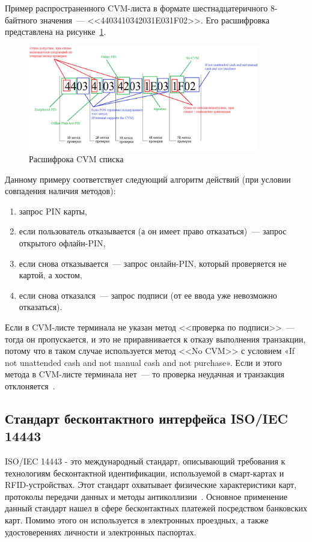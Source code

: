 Пример распространенного CVM-листа в формате шестнадцатеричного 8-байтного значения~--- <<4403410342031E031F02>>.
Его расшифровка представлена на рисунке~\ref{fig:cvm_check}.

\begin{figure}[H]
    \centering
    \includegraphics[width=0.9\textwidth]{images/research/cvm_check}
    \caption{\centering Расшифрока CVM списка}
    \label{fig:cvm_check}
\end{figure}

Данному примеру соответствует следующий алгоритм действий (при условии совпадения наличия методов):

\begin{enumerate}
    \item запрос PIN карты,
    \item если пользователь отказывается (а он имеет право отказаться)~--- запрос открытого офлайн-PIN,
    \item если снова отказывается~--- запрос онлайн-PIN, который проверяется не картой, а хостом,
    \item если снова отказался~--- запрос подписи (от ее ввода уже невозможно отказаться).
\end{enumerate}

Если в CVM-листе терминала не указан метод <<проверка по подписи>>~--- тогда он пропускается, и это не приравнивается к отказу выполнения транзакции, потому что в таком случае используется метод <<No CVM>> с условием «If not unattended cash and not manual cash and not purchase».
Если и этого метода в CVM-листе терминала нет~--– то проверка неудачная и транзакция отклоняется~\cite{habr_cvm}.


\subsection{Стандарт бесконтактного интерфейса ISO/IEC 14443}

ISO/IEC 14443 - это международный стандарт, описывающий требования к технологиям бесконтактной идентификации, используемой в смарт-картах и
RFID-устройствах. 
Этот стандарт охватывает физические характеристики карт, протоколы передачи данных и методы антиколлизии~\cite{iso_14443}.
Основное применение данный стандарт нашел в сфере бесконтактных платежей посредством банковских карт.
Помимо этого он используется в электронных проездных, а также удостоверениях личности и электронных паспортах.

